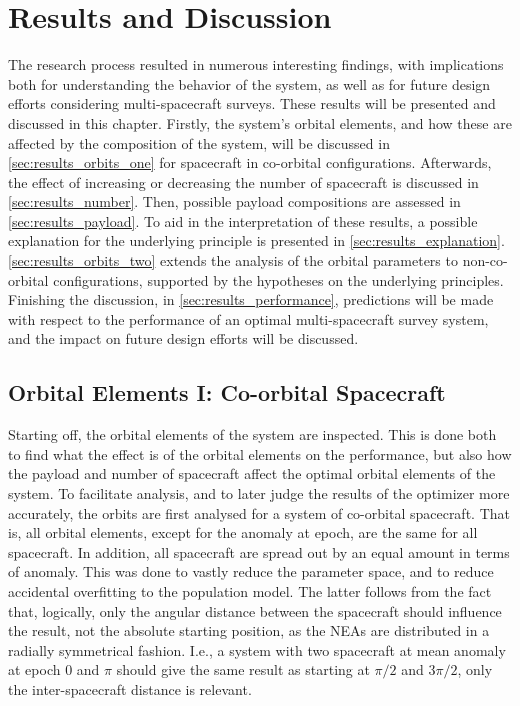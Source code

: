 \chapter{Results and Discussion}
\label{ch:results}
The research process resulted in numerous interesting findings, with implications both for understanding the behavior of the system, as well as for future design efforts considering multi-spacecraft surveys. These results will be presented and discussed in this chapter. Firstly, the system's orbital elements, and how these are affected by the composition of the system, will be discussed in \autoref{sec:results_orbits_one} for spacecraft in co-orbital configurations. Afterwards, the effect of increasing or decreasing the number of spacecraft is discussed in \autoref{sec:results_number}. Then, possible payload compositions are assessed in \autoref{sec:results_payload}. To aid in the interpretation of these results, a possible explanation for the underlying principle is presented in \autoref{sec:results_explanation}. \autoref{sec:results_orbits_two} extends the analysis of the orbital parameters to non-co-orbital configurations, supported by the hypotheses on the underlying principles. Finishing the discussion, in \autoref{sec:results_performance}, predictions will be made with respect to the performance of an optimal multi-spacecraft survey system, and the impact on future design efforts will be discussed.


\section{Orbital Elements I: Co-orbital Spacecraft}
\label{sec:results_orbits_one}
Starting off, the orbital elements of the system are inspected. This is done both to find what the effect is of the orbital elements on the performance, but also how the payload and number of spacecraft affect the optimal orbital elements of the system. To facilitate analysis, and to later judge the results of the optimizer more accurately, the orbits are first analysed for a system of co-orbital spacecraft. That is, all orbital elements, except for the anomaly at epoch, are the same for all spacecraft. In addition, all spacecraft are spread out by an equal amount in terms of anomaly. This was done to vastly reduce the parameter space, and to reduce accidental overfitting to the population model. The latter follows from the fact that, logically, only the angular distance between the spacecraft should influence the result, not the absolute starting position, as the NEAs are distributed in a radially symmetrical fashion. I.e., a system with two spacecraft at mean anomaly at epoch $0$ and $\pi$ should give the same result as starting at $\pi/2$ and $3\pi/2$, only the inter-spacecraft distance is relevant.\\

